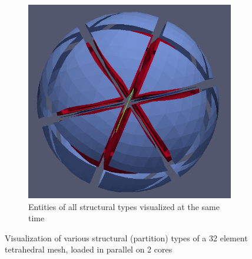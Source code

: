 \begin{figure}
	\begin{subfigure}[b]{0.46\textwidth} \vspace{5mm} \hspace{12mm} \includegraphics[scale=0.21]{images/32-full}  \captionsetup{width=0.6\textwidth} \caption{ Entities of all structural types visualized at the same time } \end{subfigure}
	\caption{ Visualization of various structural (partition) types of a 32 element tetrahedral mesh, loaded in parallel on 2 cores }
	\label{fig:result:spherestruct}
\end{figure}

